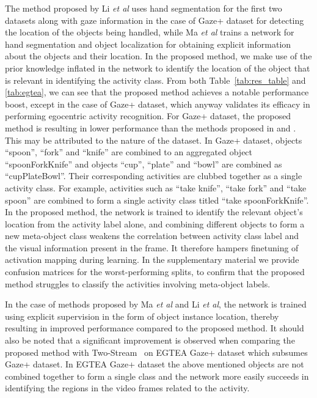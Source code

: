 \documentclass{bmvc2k}
\def\etal{\emph{et al}\bmvaOneDot}
\newcommand{\rev}[2]{#2}
\begin{document}
The method proposed by Li \etal \cite{li2015delving} uses hand segmentation for the first two datasets along with gaze information in the case of Gaze+ dataset for detecting the location of the objects being handled, while Ma \etal \cite{ma2016deeper} trains a network for hand segmentation and object localization for obtaining explicit information about the objects and their location. In the proposed method, we make use of the prior knowledge inflated in the network to identify the location of the object that is relevant in identifying the activity class. From both Table~\ref{tab:res_table} and \ref{tab:egtea}, we can see that the proposed method achieves a notable performance boost, except in the case of Gaze+ dataset, which anyway validates its efficacy in performing egocentric activity recognition. For Gaze+ dataset, the proposed method is resulting in lower performance than the methods proposed in \cite{ma2016deeper} and \cite{li2015delving}. This may be attributed to the nature of the dataset. In Gaze+ dataset, objects ``spoon'', ``fork'' and ``knife'' are combined to an aggregated object ``spoonForkKnife'' and objects ``cup'', ``plate'' and ``bowl'' are combined as ``cupPlateBowl''. Their corresponding activities are clubbed together as a single activity class. For example, activities such as ``take knife'', ``take fork'' and ``take spoon'' are combined to form a single activity class titled ``take spoonForkKnife''. In the proposed method, the network is trained to identify the relevant object's location from the activity label alone, and combining different objects to form a new \rev{pseudo}{meta}-object class weakens the correlation between activity class label and the visual information present in the frame. It therefore hampers finetuning of activation mapping during learning. In the supplementary material we provide confusion matrices for the worst-performing splits, to confirm that the proposed method struggles to classify the activities involving meta-object labels.
\rev{This prevents the proposed method from utilizing the semantics of the activity label for identifying relevant objects related to the activity under consideration.}{} 
In the case of methods proposed by Ma \etal \cite{ma2016deeper} and Li \etal \cite{li2015delving}, the network is trained using explicit supervision in the form of object instance location, thereby resulting in improved performance compared to the proposed method. It should also be noted that a significant improvement is observed when comparing the proposed method with Two-Stream~\cite{simonyan2014two} on EGTEA Gaze+ dataset which subsumes Gaze+ dataset. In EGTEA Gaze+ dataset the above mentioned objects are not combined together to form a single class and the network more easily succeeds in identifying the regions in the video frames related to the activity.
\end{document}
